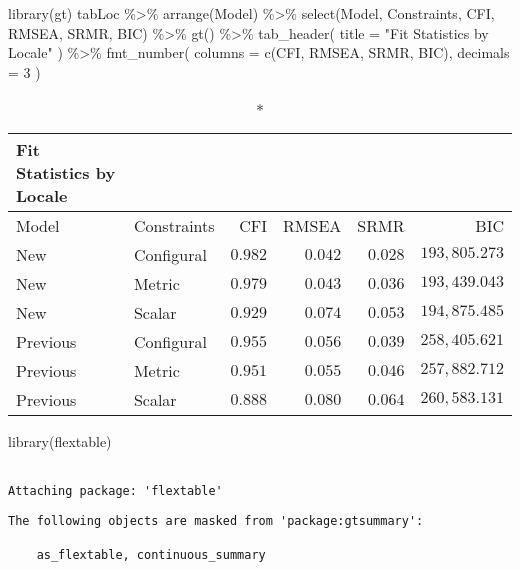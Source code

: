 \documentclass[
  letterpaper,
  DIV=11,
  numbers=noendperiod]{scrartcl}
\newenvironment{Shaded}{\begin{snugshade}}{\end{snugshade}}
\newcommand{\AttributeTok}[1]{\textcolor[rgb]{0.40,0.45,0.13}{#1}}
\newcommand{\DecValTok}[1]{\textcolor[rgb]{0.68,0.00,0.00}{#1}}
\newcommand{\FunctionTok}[1]{\textcolor[rgb]{0.28,0.35,0.67}{#1}}
\newcommand{\NormalTok}[1]{\textcolor[rgb]{0.00,0.23,0.31}{#1}}
\newcommand{\SpecialCharTok}[1]{\textcolor[rgb]{0.37,0.37,0.37}{#1}}
\newcommand{\StringTok}[1]{\textcolor[rgb]{0.13,0.47,0.30}{#1}}
\begin{document}
\begin{Shaded}
\begin{Highlighting}[]
\FunctionTok{library}\NormalTok{(gt)}
\NormalTok{tabLoc }\SpecialCharTok{\%\textgreater{}\%}
  \FunctionTok{arrange}\NormalTok{(Model) }\SpecialCharTok{\%\textgreater{}\%}
  \FunctionTok{select}\NormalTok{(Model, Constraints, CFI, RMSEA, SRMR, BIC) }\SpecialCharTok{\%\textgreater{}\%}
  \FunctionTok{gt}\NormalTok{() }\SpecialCharTok{\%\textgreater{}\%}
  \FunctionTok{tab\_header}\NormalTok{(}
    \AttributeTok{title =} \StringTok{"Fit Statistics by Locale"}
\NormalTok{  ) }\SpecialCharTok{\%\textgreater{}\%}
  \FunctionTok{fmt\_number}\NormalTok{(}
    \AttributeTok{columns =} \FunctionTok{c}\NormalTok{(CFI, RMSEA, SRMR, BIC),}
    \AttributeTok{decimals =} \DecValTok{3}
\NormalTok{  )}
\end{Highlighting}
\end{Shaded}

\begin{longtable*}{llrrrr}
\caption*{
{\large Fit Statistics by Locale}
} \\ 
\toprule
Model & Constraints & CFI & RMSEA & SRMR & BIC \\ 
\midrule\addlinespace[2.5pt]
New & Configural & $0.982$ & $0.042$ & $0.028$ & $193,805.273$ \\ 
New & Metric & $0.979$ & $0.043$ & $0.036$ & $193,439.043$ \\ 
New & Scalar & $0.929$ & $0.074$ & $0.053$ & $194,875.485$ \\ 
Previous & Configural & $0.955$ & $0.056$ & $0.039$ & $258,405.621$ \\ 
Previous & Metric & $0.951$ & $0.055$ & $0.046$ & $257,882.712$ \\ 
Previous & Scalar & $0.888$ & $0.080$ & $0.064$ & $260,583.131$ \\ 
\bottomrule
\end{longtable*}

\begin{Shaded}
\begin{Highlighting}[]
\FunctionTok{library}\NormalTok{(flextable)}
\end{Highlighting}
\end{Shaded}

\begin{verbatim}

Attaching package: 'flextable'
\end{verbatim}

\begin{verbatim}
The following objects are masked from 'package:gtsummary':

    as_flextable, continuous_summary
\end{verbatim}
\end{document}
